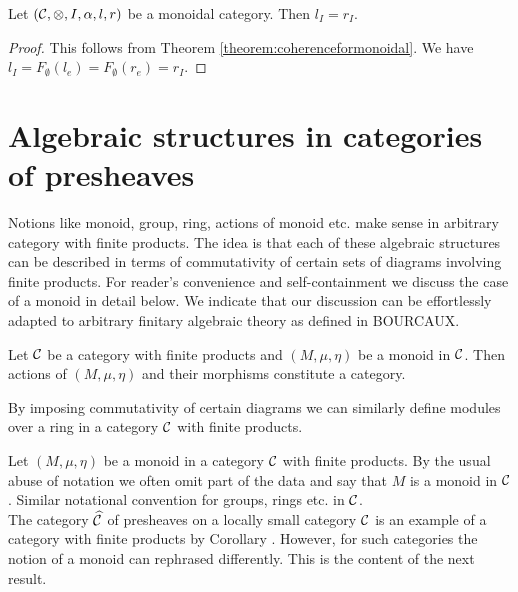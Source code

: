 \begin{corollary}\label{corollary:unitsareequalonunit}
Let $({\mathcal C},\otimes, I,\alpha, l, r)$ be a monoidal category. Then $l_I = r_I$.
\end{corollary}
\begin{proof}
This follows from Theorem \ref{theorem:coherenceformonoidal}. We have $l_I=F_\emptyset(l_e) = F_\emptyset(r_e)=r_I$.  
\end{proof}

\section{Algebraic structures in categories of presheaves}
\noindent
Notions like  monoid, group, ring, actions of monoid etc. make sense in arbitrary category with finite products. The idea is that each of these algebraic structures can be described in terms of commutativity of certain sets of diagrams involving finite products. For reader's convenience and self-containment we discuss the case of a monoid in detail below. We indicate that our discussion can be effortlessly adapted to arbitrary finitary algebraic theory as defined in BOURCAUX.



\begin{remark}
Let ${\mathcal C}$ be a category with finite products and $(M,\mu,\eta)$ be a monoid in ${\mathcal C}$. Then actions of $(M,\mu,\eta)$ and their morphisms constitute a category. 
\end{remark}

\begin{remark}
By imposing commutativity of certain diagrams we can similarly define modules over a ring in a category ${\mathcal C}$ with finite products.
\end{remark}
\noindent
Let $(M,\mu,\eta)$ be a monoid in a category ${\mathcal C}$ with finite products. By the usual abuse of notation we often omit part of the data and say that $M$ is a monoid in ${\mathcal C}$. Similar notational convention for groups, rings etc. in ${\mathcal C}$.\\
The category $\widehat{{\mathcal C}}$ of presheaves on a locally small category ${\mathcal C}$ is an example of a category with finite products by Corollary . However, for such categories the notion of a monoid can rephrased differently. This is the content of the next result.

